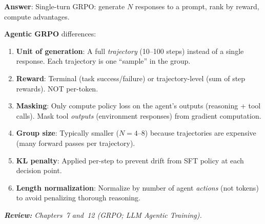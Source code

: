 \begin{questionbox}
\textbf{Answer}: Single-turn GRPO: generate $N$ responses to a prompt, rank by reward, compute advantages.

\textbf{Agentic GRPO} differences:

\begin{enumerate}
  \item \textbf{Unit of generation}: A full \emph{trajectory} (10--100 steps) instead of a single response. Each trajectory is one ``sample'' in the group.
  \item \textbf{Reward}: Terminal (task success/failure) or trajectory-level (sum of step rewards). NOT per-token.
  \item \textbf{Masking}: Only compute policy loss on the agent’s outputs (reasoning + tool calls). Mask tool \emph{outputs} (environment responses) from gradient computation.
  \item \textbf{Group size}: Typically smaller ($N=4$--8) because trajectories are expensive (many forward passes per trajectory).
  \item \textbf{KL penalty}: Applied per-step to prevent drift from SFT policy at each decision point.
  \item \textbf{Length normalization}: Normalize by number of agent \emph{actions} (not tokens) to avoid penalizing thorough reasoning.
\end{enumerate}

\emph{\textbf{Review:} Chapters~7 and~12 (GRPO; LLM Agentic Training).}
\end{questionbox}

